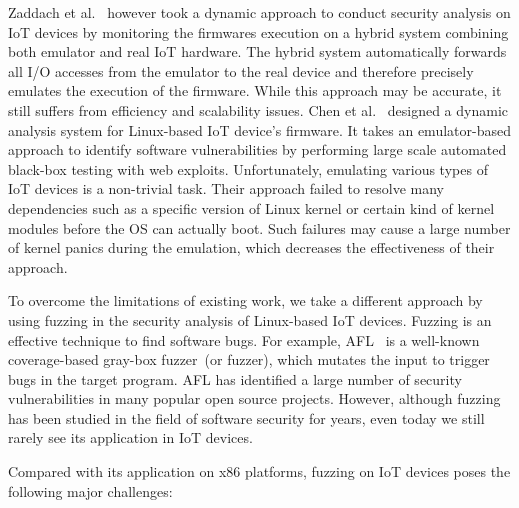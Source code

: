 Zaddach et al.~\cite{zaddach2014avatar} however took a dynamic approach to conduct security analysis on IoT devices by monitoring the firmwares execution on a hybrid system combining both emulator and real IoT hardware. The hybrid system automatically forwards all I/O accesses from the emulator to the real device and therefore precisely emulates the execution of the firmware. While this approach may be accurate, it still suffers from efficiency and scalability issues. Chen et al.~\cite{chen2016towards} designed a dynamic analysis system for Linux-based IoT device's firmware. It takes an emulator-based approach to identify software vulnerabilities by performing large scale automated black-box testing with web exploits. Unfortunately, emulating various types of IoT devices is a non-trivial task. Their approach failed to resolve many dependencies such as a specific version of Linux kernel or certain kind of kernel modules before the OS can actually boot. Such failures may cause a large number of kernel panics during the emulation, which decreases the effectiveness of their approach. 

To overcome the limitations of existing work, we take a different approach by using fuzzing in the security analysis of Linux-based IoT devices. Fuzzing is an effective technique to find software bugs. For example, AFL~\cite{aflweb} is a well-known coverage-based gray-box fuzzer~(or fuzzer), which mutates the input to trigger bugs in the target program. AFL has identified a large number of security vulnerabilities in many popular open source projects. However, although fuzzing has been studied in the field of software security for years, even today we still rarely see its application in IoT devices. 


Compared with its application on x86 platforms, fuzzing on IoT devices poses the following major challenges: 

